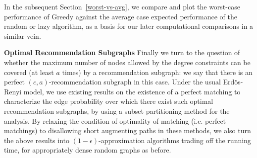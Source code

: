 In the subsequent Section~\ref{worst-vs-avg}, we compare and plot the worst-case
performance of Greedy against the average case expected performance of the random
or lazy algorithm, as a basis for our later computational comparisons in a
similar vein. \vs

{\bf Optimal Recommendation Subgraphs}
Finally we turn to the question of whether the maximum number of nodes allowed
by the degree constraints can be covered (at least $a$ times) by a recommendation
subgraph: we say that there is an perfect $(c,a)$-recommendation subgraph in this
case. Under the usual Erd\"os-Renyi model, we use existing results on the
existence of a perfect matching to characterize the edge probability over which
there exist such optimal recommendation subgraphs, by using a subset partitioning
method for the analysis. By relaxing the condition of optimality of matching (i.e.
perfect matchings) to disallowing short augmenting paths in these methods, we also
turn the above results into $(1-\epsilon)$-approximation algorithms trading off
the running time, for appropriately dense random graphs as before. \vs
